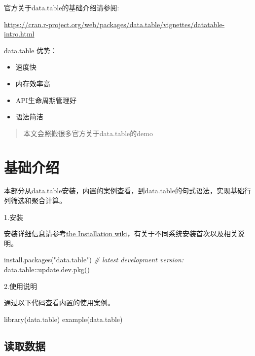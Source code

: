 \documentclass[
]{book}
\newenvironment{Shaded}{\begin{snugshade}}{\end{snugshade}}
\newcommand{\CommentTok}[1]{\textcolor[rgb]{0.56,0.35,0.01}{\textit{#1}}}
\newcommand{\FunctionTok}[1]{\textcolor[rgb]{0.00,0.00,0.00}{#1}}
\newcommand{\NormalTok}[1]{#1}
\newcommand{\SpecialCharTok}[1]{\textcolor[rgb]{0.00,0.00,0.00}{#1}}
\newcommand{\StringTok}[1]{\textcolor[rgb]{0.31,0.60,0.02}{#1}}
\providecommand{\tightlist}{%
  \setlength{\itemsep}{0pt}\setlength{\parskip}{0pt}}
\begin{document}
官方关于data.table的基础介绍请参阅:

\url{https://cran.r-project.org/web/packages/data.table/vignettes/datatable-intro.html}

data.table 优势：

\begin{itemize}
\tightlist
\item
  速度快
\item
  内存效率高
\item
  API生命周期管理好
\item
  语法简洁
\end{itemize}

\begin{quote}
本文会照搬很多官方关于data.table的demo
\end{quote}

\hypertarget{ux57faux7840ux4ecbux7ecd}{%
\section{基础介绍}\label{ux57faux7840ux4ecbux7ecd}}

本部分从data.table安装，内置的案例查看，到data.table的句式语法，实现基础行列筛选和聚合计算。

1.安装

安装详细信息请参考\href{https://github.com/Rdatatable/data.table/wiki/Installation}{the Installation wiki}，有关于不同系统安装首次以及相关说明。

\begin{Shaded}
\begin{Highlighting}[]
\FunctionTok{install.packages}\NormalTok{(}\StringTok{"data.table"}\NormalTok{)}
\CommentTok{\# latest development version:}
\NormalTok{data.table}\SpecialCharTok{::}\FunctionTok{update.dev.pkg}\NormalTok{()}
\end{Highlighting}
\end{Shaded}

2.使用说明

通过以下代码查看内置的使用案例。

\begin{Shaded}
\begin{Highlighting}[]
\FunctionTok{library}\NormalTok{(data.table)}
\FunctionTok{example}\NormalTok{(data.table)}
\end{Highlighting}
\end{Shaded}

\hypertarget{ux8bfbux53d6ux6570ux636e}{%
\subsection{读取数据}\label{ux8bfbux53d6ux6570ux636e}}
\end{document}
